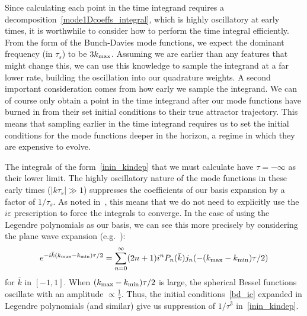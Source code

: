 Since calculating each point in the time integrand requires a
decomposition~\eqref{mode1Dcoeffs_integral}, which is highly oscillatory
at early times, it is worthwhile to consider how to perform the
time integral efficiently. From the form of the Bunch-Davies mode functions,
we expect the dominant frequency (in $\tau_s$) to be $3{k_\text{max}}$.
Assuming we are earlier than any features that might change this,
we can use this knowledge to sample the integrand at a far lower rate,
building the oscillation into our quadrature weights.
A second important consideration comes from how early we sample the integrand.
We can of course only obtain a point in the time integrand after our mode
functions have burned in from their set initial conditions to their true
attractor trajectory. This means that sampling earlier in the time integrand
requires us to set the initial conditions for the mode functions deeper
in the horizon, a regime in which they are expensive to evolve.


The integrals of the form~\eqref{inin_kindep} that we must calculate have $\tau=-\infty$ as their lower limit.
The highly oscillatory nature of the mode functions in these early times ($\lvert k\tau_s\rvert\gg1$) suppresses the
coefficients of our basis expansion by a factor of $1/\tau_s$.
As noted in~\cite{Funakoshi}, this means that we do not need to
explicitly use the $i\varepsilon$ prescription to force the integrals to converge.
In the case of using the Legendre polynomials as our
basis, we can see this more precisely by considering
the plane wave expansion (e.g.~\cite{finite_ft_legendre}):
\begin{align}\label{exp_expansion}
    e^{-i\bar{k}({k_\text{max}}-{k_\text{min}})\tau/2} = \sum_{n=0}^{\infty}(2n+1)i^n P_n(\bar{k})j_n(-({k_\text{max}}-{k_\text{min}})\tau/2)
\end{align}
for $\bar{k}$ in $[-1,1]$. When $({k_\text{max}}-{k_\text{min}})\tau/2$ is large, the spherical Bessel functions
oscillate with an amplitude $\propto\frac{1}{\tau}$. Thus,
the initial conditions~\eqref{bd_ic} expanded in Legendre polynomials (and similar)
give us suppression of $1/\tau^3$ in~\eqref{inin_kindep}.


